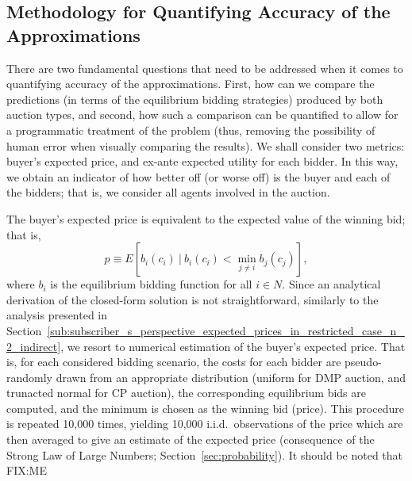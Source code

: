 \subsection{Methodology for Quantifying Accuracy of the Approximations} %
\label{sub:methodology_for_quantifying_accuracy_of_the_approximations_approximation}
There are two fundamental questions that need to be addressed when it comes to quantifying accuracy of the approximations. First, how can we compare the predictions (in terms of the equilibrium bidding strategies) produced by both auction types, and second, how such a comparison can be quantified to allow for a programmatic treatment of the problem (thus, removing the possibility of human error when visually comparing the results). We shall consider two metrics: buyer's expected price, and ex-ante expected utility for each bidder. In this way, we obtain an indicator of how better off (or worse off) is the buyer and each of the bidders; that is, we consider all agents involved in the auction.

The buyer's expected price is equivalent to the expected value of the winning bid; that is,
\begin{equation}
  \label{eq:expected_price_approximation}
  p \equiv E[b_i(c_i) \:\vert\: b_i(c_i) < \min_{j\neq i} b_j(c_j)],
\end{equation}
where $b_i$ is the equilibrium bidding function for all $i\in N$. Since an analytical derivation of the closed-form solution is not straightforward, similarly to the analysis presented in Section~\ref{sub:subscriber_s_perspective_expected_prices_in_restricted_case_n_2_indirect}, we resort to numerical estimation of the buyer's expected price. That is, for each considered bidding scenario, the costs for each bidder are pseudo-randomly drawn from an appropriate distribution (uniform for DMP auction, and trunacted normal for CP auction), the corresponding equilibrium bids are computed, and the minimum is chosen as the winning bid (price). This procedure is repeated 10,000 times, yielding 10,000 i.i.d.~observations of the price which are then averaged to give an estimate of the expected price (consequence of the Strong Law of Large Numbers; Section~\ref{sec:probability}). It should be noted that FIX:ME

